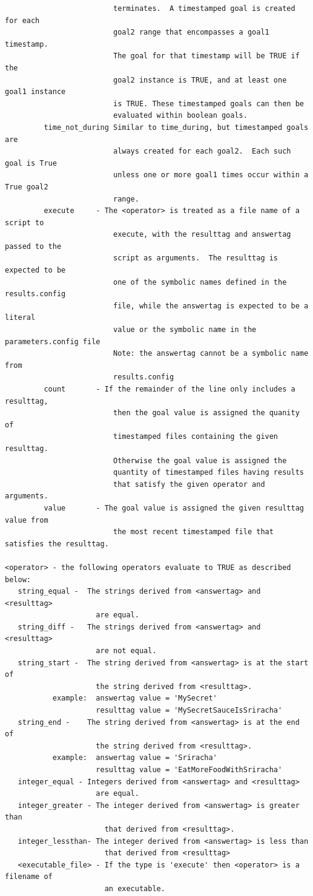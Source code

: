 \documentclass[12pt]{article}
\begin{document}
\begin{verbatim}
                         terminates.  A timestamped goal is created for each
                         goal2 range that encompasses a goal1 timestamp.
                         The goal for that timestamp will be TRUE if the
                         goal2 instance is TRUE, and at least one goal1 instance
                         is TRUE. These timestamped goals can then be
                         evaluated within boolean goals.
         time_not_during Similar to time_during, but timestamped goals are
                         always created for each goal2.  Each such goal is True
                         unless one or more goal1 times occur within a True goal2
                         range.
         execute     - The <operator> is treated as a file name of a script to 
                         execute, with the resulttag and answertag passed to the 
                         script as arguments.  The resulttag is expected to be 
                         one of the symbolic names defined in the results.config 
                         file, while the answertag is expected to be a literal 
                         value or the symbolic name in the parameters.config file 
                         Note: the answertag cannot be a symbolic name from 
                         results.config 
         count       - If the remainder of the line only includes a resulttag,
                         then the goal value is assigned the quanity of 
                         timestamped files containing the given resulttag.  
                         Otherwise the goal value is assigned the
                         quantity of timestamped files having results
                         that satisfy the given operator and arguments.
         value       - The goal value is assigned the given resulttag value from
                         the most recent timestamped file that satisfies the resulttag.
 
<operator> - the following operators evaluate to TRUE as described below:
   string_equal -  The strings derived from <answertag> and <resulttag>
                     are equal.
   string_diff -   The strings derived from <answertag> and <resulttag>
                     are not equal.
   string_start -  The string derived from <answertag> is at the start of 
                     the string derived from <resulttag>.
           example:  answertag value = 'MySecret'
                     resulttag value = 'MySecretSauceIsSriracha'
   string_end -    The string derived from <answertag> is at the end of
                     the string derived from <resulttag>.
           example:  answertag value = 'Sriracha'
                     resulttag value = 'EatMoreFoodWithSriracha'
   integer_equal - Integers derived from <answertag> and <resulttag>
                     are equal.
   integer_greater - The integer derived from <answertag> is greater than
                       that derived from <resulttag>.
   integer_lessthan- The integer derived from <answertag> is less than
                       that derived from <resulttag>
   <executable_file> - If the type is 'execute' then <operator> is a filename of 
                       an executable.
             

\end{verbatim}
\end{document}
